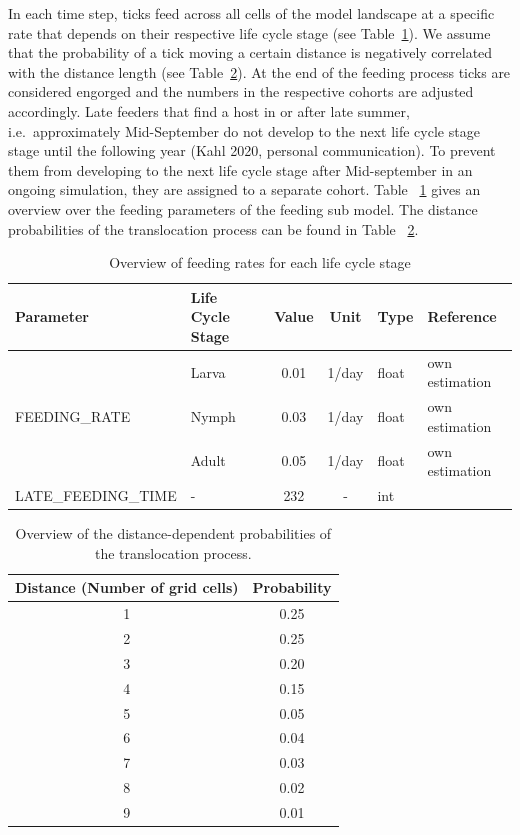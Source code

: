 \documentclass[a4paper, 11pt]{scrartcl}
\begin{document}
In each time step, ticks feed across all cells of the model landscape at a specific rate that depends on their respective life cycle stage (see Table~\ref{tab:feeding_parameters}). We assume that the probability of a tick moving a certain distance is negatively correlated with the distance length (see Table~\ref{tab:distance_probabilities}). At the end of the feeding process ticks are considered engorged and the numbers in the respective cohorts are adjusted accordingly. Late feeders that find a host in or after late summer, i.e.\ approximately Mid-September do not develop to the next life cycle stage stage until the following year (Kahl 2020, personal communication). To prevent them from developing to the next life cycle stage after Mid-september in an ongoing simulation, they are assigned to a separate cohort. Table ~\ref{tab:feeding_parameters} gives an overview over the feeding parameters of the feeding sub model. The distance probabilities of the translocation process can be found in Table ~\ref{tab:distance_probabilities}.

\begin{table}[h!]
\caption[Overview of feeding rates for each life cycle stage]{Overview of feeding rates for each life cycle stage}
\label{tab:feeding_parameters}
\begin{tabularx}{\textwidth}{llccll}
\toprule
\textbf{Parameter} & \textbf{Life Cycle Stage} & \textbf{Value} & \textbf{Unit} & \textbf{Type}	& \textbf{Reference} \\
\midrule
\multirow{3}{*}{\tiny{FEEDING\_RATE}} & Larva	& 0.01	& 1/day & float	 & own estimation \\
									  & Nymph	& 0.03	& 1/day & float	 & own estimation \\
									  & Adult	& 0.05	& 1/day & float	 & own estimation \\
\tiny{LATE\_FEEDING\_TIME}			  & - & 232 & -	& int	 & \cite{tba} \\
\bottomrule
\end{tabularx}
\end{table}

\begin{table}[h!]
\centering
\caption[Overview of distance-dependent probabilities of the translocation process]{Overview of the distance-dependent probabilities of the translocation process.}
\label{tab:distance_probabilities}
\begin{tabularx}{\textwidth}{cc}
\toprule
\textbf{Distance (Number of grid cells)}	& \textbf{Probability}	\\
\midrule
1 	& 0.25 \\
2	& 0.25 \\
3	& 0.20 \\
4	& 0.15 \\
5	& 0.05 \\
6	& 0.04 \\
7	& 0.03 \\
8	& 0.02 \\
9	& 0.01 \\
\bottomrule
\end{tabularx}
\end{table}
\end{document}
